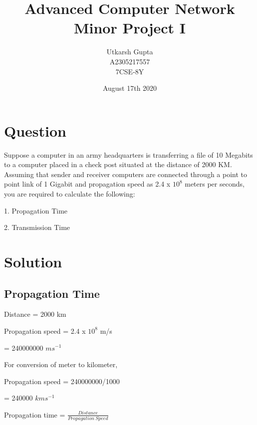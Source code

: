 \documentclass{article}
\title{\textbf{Advanced Computer Network \\
               Minor Project I}}
\author{\Large{Utkarsh Gupta \\
        \large A2305217557 \\
        \large 7CSE-8Y}}
\date{\Large{August 17th 2020}}
\begin{document}
\maketitle

\section{Question}

Suppose a computer in an army headquarters is transferring a file of 10 Megabits to a computer placed in a
check post situated at the distance of 2000 KM. Assuming that sender and receiver  computers are connected
through a point to point link of 1 Gigabit and propagation speed as 2.4 x $10^{8}$ meters per seconds, you are
required to calculate the following:

1.	Propagation Time

2.	Transmission Time 

\section{Solution}

\subsection{Propagation Time}

\vspace{2mm}
\hspace{5.5mm} Distance \hspace{1.95cm} = 2000 km

\hspace{0.3mm} Propagation speed \hspace{0.4cm} = 2.4 x $10^{8}$ m/s

\hspace{3.5cm} = 240000000 $ms^{-1}$

\vspace{5mm}
\hspace{0.3mm} For conversion of meter to kilometer,

\hspace{0.3mm} Propagation speed \hspace{0.4cm} = 240000000/1000

\hspace{3.5cm} = 240000 $kms^{-1}$

\vspace{5mm}
\hspace{0.3mm} Propagation time \hspace{0.4cm} = \Large{$\frac{Distance}{Propagation\ Speed}$}
\vspace{2mm}
\end{document}

